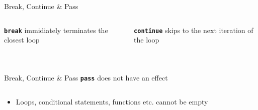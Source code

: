         \begin{frame}{Break, Continue \& Pass}
            \begin{columns}
                \begin{column}{0.5\textwidth}
                    \textbf{\texttt{break}} immidiately terminates the closest loop
                    \bigskip  
                    \inputminted[frame=single,framesep=2pt]{python3}{../Lecture3/code-examples/break1.py}
                    \pause
                    \inputminted[frame=single,framesep=2pt]{python3}{../Lecture3/code-examples/break2.py}
                \end{column}
               \pause 
                \begin{column}{0.5\textwidth}
                    \textbf{\texttt{continue}} skips to the next iteration of the loop
                    \bigskip  
                    \inputminted[frame=single,framesep=2pt]{python3}{../Lecture3/code-examples/continue1.py}
                    \pause
                    \inputminted[frame=single,framesep=2pt]{python3}{../Lecture3/code-examples/continue2.py}
                \end{column} 
            \end{columns}
        \end{frame}
        
        \begin{frame}{Break, Continue \& Pass}
            \pause
            \LARGE
            \textbf{\texttt{pass}} does not have an effect
            \bigskip  
            \inputminted[frame=single,framesep=2pt]{python3}{../Lecture3/code-examples/pass.py}
            \pause
            \begin{itemize}
                \item Loops, conditional statements, functions etc. cannot be empty 
            \end{itemize}
        \end{frame}


